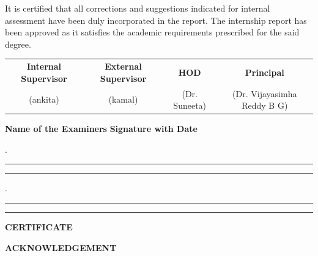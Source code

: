 \documentclass[12pt,a4paper]{report}
\begin{document}
\vspace{0.25cm}

\noindent
It is certified that all corrections and suggestions indicated for internal assessment have been duly incorporated in the report. The internship report has been approved as it satisfies the academic requirements prescribed for the said degree.

\vspace{1.2cm}

\begin{center}

\renewcommand{\arraystretch}{1.15}

\begin{tabular}{c c c c}

\textbf{Internal Supervisor} &
\textbf{External Supervisor} &
\textbf{HOD} &
\textbf{Principal}
\\[4pt]

(ankita) &
(kamal) &
(Dr. Suneeta) &
(Dr. Vijayasimha Reddy B G)

\end{tabular}

\end{center}

\vspace{1cm}

\noindent
\textbf{Name of the Examiners}
\hfill
\textbf{Signature with Date}

\vspace{0.4cm}

.\hspace{0.2cm}\rule{5cm}{0.4pt}
\hfill
\rule{4cm}{0.4pt}

\vspace{0.4cm}

.\hspace{0.2cm}\rule{5cm}{0.4pt}
\hfill
\rule{4cm}{0.4pt}


\newpage
\setcounter{page}{2}  %
\begin{center}
{\LARGE \textbf{CERTIFICATE}\par}
\end{center}

\vspace{0.5cm}
\setlength{\parskip}{1em}


\newpage
\setcounter{page}{3}  %
\begin{center}
{\LARGE \textbf{ACKNOWLEDGEMENT}\par}
\end{center}
\end{document}
